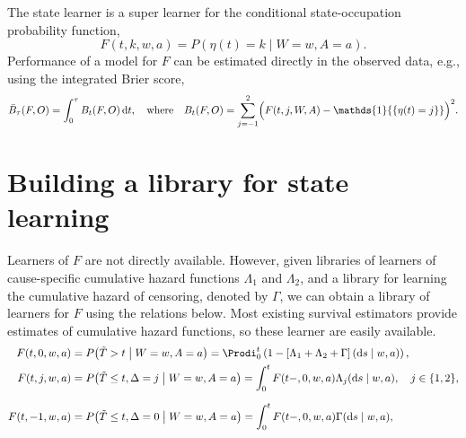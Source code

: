 \documentclass[a0,portrait]{a0poster}
\newcommand*\diff{\mathop{}\!\mathrm{d}}
\newcommand{\midd}{\; \middle|\;}
\newcommand{\1}{\mathds{1}}
\begin{document}
\begin{minipage}{\textwidth}
\begin{minipage}[t]{1\linewidth}
\begin{multicols}{2}
\vspace{1cm}

The state learner is a super learner for the conditional state-occupation
probability function, 
\begin{equation*}
  F(t, k, w,a) = P(\eta(t) = k \mid W=w, A=a).
\end{equation*}
Performance of a model for \( F \) can be estimated directly in the observed
data, e.g., using the integrated Brier score,
\begin{equation*}
  \bar B_\tau( F,O) = \int_0^{\tau} B_t(F,O) \diff t,
  \quad \text{where} \quad 
  B_t(F,O) = \sum_{j=-1}^{2}
  \Bigl(
    F(t,j,W,A) - \1{\{\eta(t)=j\}}
  \Bigr)^2.
\end{equation*}

\section*{Building a library for state learning}

Learners of \( F \) are not directly available. However, given libraries of
learners of cause-specific cumulative hazard functions \( \Lambda_{1} \) and
\( \Lambda_{2} \), and a library for learning the cumulative hazard of
censoring, denoted by $\Gamma$, we can obtain a library of learners for \( F \)
using the relations below. Most existing survival estimators provide estimates
of cumulative hazard functions, so these learner are easily available.
\begin{align*}
  F(t, 0, w,a)
  &= P{\left( \tilde{T}>t \midd W=w,A=a \right)}
    = \Prodi_0^t
    \left( 1 - 
    \left[\Lambda_{1} + \Lambda_{2} + \Gamma
    \right](\diff s \mid w,a) \right),
  \\
  F(t, j, w,a)
  & = P{\left(
    \tilde{T} \leq t, \Delta=j \midd W=w, A=a
    \right)}
    = \int_0^t F(t-,0, w,a)  \Lambda_{j}(\diff s \mid w,a),
    \quad  j \in \{1,2\},
  \\[.7em]
  F(t, -1, w,a)
  & =
    P{\left( \tilde{T} \leq t, \Delta=0 \midd W=w, A=a \right)}
    = \int_0^tF(t-,0, w,a)  \Gamma(\diff s \mid w,a),
\end{align*}


\end{multicols}
\end{minipage}
\end{minipage}
\end{document}
